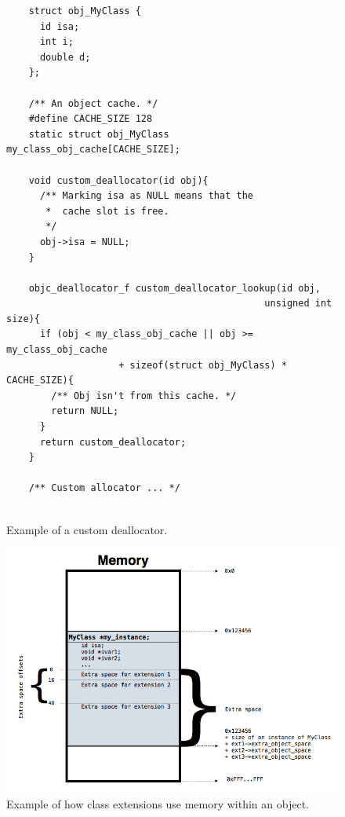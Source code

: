\begin{figure}[htbp] 
  \begin{verbatim}
    struct obj_MyClass {
      id isa;
      int i;
      double d;
    };
    
    /** An object cache. */
    #define CACHE_SIZE 128
    static struct obj_MyClass my_class_obj_cache[CACHE_SIZE];
    
    void custom_deallocator(id obj){
      /** Marking isa as NULL means that the
       *  cache slot is free.
       */
      obj->isa = NULL;
    }
    
    objc_deallocator_f custom_deallocator_lookup(id obj, 
                                              unsigned int size){
      if (obj < my_class_obj_cache || obj >= my_class_obj_cache 
                    + sizeof(struct obj_MyClass) * CACHE_SIZE){
        /** Obj isn't from this cache. */
        return NULL;
      }
      return custom_deallocator;
    }
    
    /** Custom allocator ... */
    
  \end{verbatim}
  \centering{}
  \caption{Example of a custom deallocator.}
  \label{fig:class_ext_dealloc_example}
\end{figure}

\begin{figure}[htbp] 
  
  \includegraphics[width=\textwidth]{img/class_extensions.png}
  
  \centering{}
  \caption{Example of how class extensions use memory within an object.}
  \label{fig:class_ext_mem_usage_img}
\end{figure}

